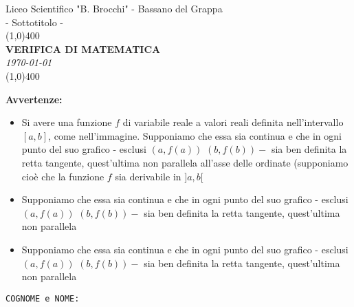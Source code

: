 \documentclass[10pt,a4paper]{exam}
\begin{document}
\begin{titlepage}

\begin{center}
	\Large{Liceo Scientifico "B. Brocchi" - Bassano del Grappa}\\[6pt]
	\large{- Sottotitolo -}\\
	\vspace{4cm}
	\line(1,0){400}\\[3.5mm]
	{\huge{\textbf{VERIFICA DI MATEMATICA}}}\\[3mm]
	\textit{\today}\\[1mm]	
	\line(1,0){400}\\
	\vspace{5cm}
\end{center}

\begin{adjustwidth}{1.5cm}{1.5cm}
\textbf{Avvertenze:}\\[6pt]
	\begin{itemize}
		\item 
			Si avere una funzione $f$ di variabile reale a valori reali definita nell'intervallo $[a, b]$, come nell'immagine. Supponiamo che essa sia continua e che in ogni punto del suo grafico - esclusi $(a, f(a))$ $(b, f(b))-$ sia ben definita la retta tangente, quest'ultima non parallela all'asse delle ordinate (supponiamo cioè che la funzione $f$ sia derivabile in $] a, b[$\\
			\item 
			Supponiamo che essa sia continua e che in ogni punto del suo grafico - esclusi $(a, f(a))$ $(b, f(b))-$ sia ben definita la retta tangente, quest'ultima non parallela\\
			\item 
			Supponiamo che essa sia continua e che in ogni punto del suo grafico - esclusi $(a, f(a))$ $(b, f(b))-$ sia ben definita la retta tangente, quest'ultima non parallela\\
		\end{itemize}
\end{adjustwidth}

\vfill
	\begin{center}
	\vspace{18pt}
	{\Large{\tt COGNOME e NOME:}}\quad \underline{\hspace{2.8in}}\\
	\end{center}
\end{titlepage}
\end{document}
